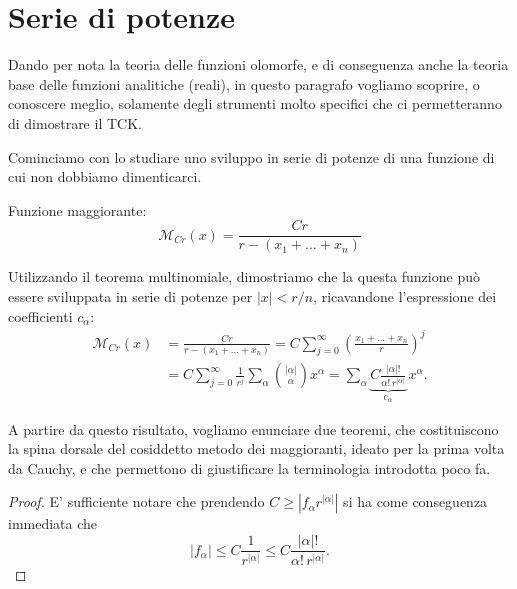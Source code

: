 \newpage
\section{Serie di potenze}\label{seriedipotenze}
Dando per nota la teoria delle funzioni olomorfe, e di conseguenza anche la teoria base delle funzioni analitiche (reali), in questo paragrafo vogliamo scoprire, o conoscere meglio, solamente degli strumenti molto specifici che ci permetteranno di dimostrare il TCK.

Cominciamo con lo studiare uno sviluppo in serie di potenze di una funzione di cui non dobbiamo dimenticarci.
\begin{definition}
Funzione maggiorante: $$\mathcal{M}_{Cr}(x)=\frac{Cr}{r-(x_1+\ldots +x_n)}$$
\end{definition}
Utilizzando il teorema multinomiale, dimostriamo che la questa funzione può essere sviluppata in serie di potenze per $|x|<r/n$, ricavandone l'espressione dei coefficienti $c_\alpha$:
\begin{align*}
\mathcal{M}_{Cr}(x) &= \frac{Cr}{r-(x_1+\ldots +x_n)} = C \sum\limits_{j=0}^\infty \left(\frac{x_1+\ldots +x_n}{r}\right)^j  \\
&= C \sum\limits_{j=0}^\infty \frac{1}{r^j} \sum\limits_\alpha  \binom{|\alpha |}{\alpha } x^\alpha = \sum\limits_\alpha 
\underbrace{C \frac{|\alpha |!}{\alpha ! \, r^{|\alpha |}}}_{c_\alpha} \, x^\alpha .
\end{align*}

A partire da questo risultato, vogliamo enunciare due teoremi, che costituiscono la spina dorsale del cosiddetto metodo dei maggioranti, ideato per la prima volta da Cauchy, e che permettono di giustificare la terminologia introdotta poco fa.

\begin{theorem}\label{teomagg}
\end{theorem}


\begin{theorem}
\end{theorem}

\begin{proof}
E' sufficiente notare che prendendo $C \geq |f_\alpha r^{|\alpha |}|$ si ha come conseguenza immediata che
$$|f_\alpha | \leq C \frac{1}{r^{|\alpha |}} \leq C \frac{|\alpha |!}{\alpha ! \, r^{|\alpha |}}.$$
\end{proof}

